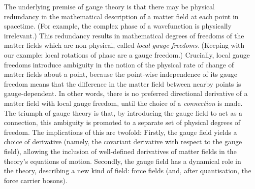 The underlying premise of gauge theory is that there may be physical redundancy in the mathematical description of a matter field at each point in spacetime.
(For example, the complex phase of a wavefunction is physically irrelevant.)
This redundancy results in mathematical degrees of freedoms of the matter fields which are non-physical, called \emph{local gauge freedoms}.
(Keeping with our example: local rotations of phase are a gauge freedom.)
Crucially, local gauge freedoms introduce ambiguity in the notion of the physical rate of change of matter fields about a point, because the point-wise independence of its gauge freedom means that the difference in the matter field between nearby points is gauge-dependent.
In other words, there is no preferred directional derivative of a matter field with local gauge freedom, until the choice of a \emph{connection} is made.
The triumph of gauge theory is that, by introducing the gauge field to act as a connection, this ambiguity is promoted to a separate set of physical degrees of freedom.
The implications of this are twofold:
Firstly, the gauge field yields a choice of derivative (namely, the covariant derivative with respect to the gauge field), allowing the inclusion of well-defined derivatives of matter fields in the theory's equations of motion.
Secondly, the gauge field has a dynamical role in the theory, describing a new kind of field: force fields (and, after quantisation, the force carrier bosons).



